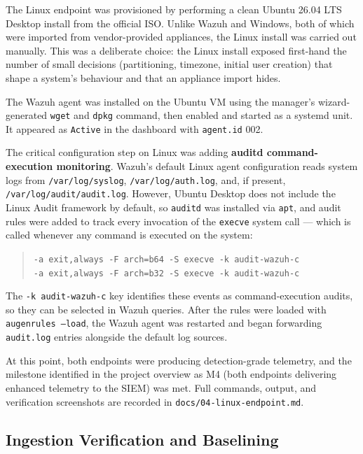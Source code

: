 The Linux endpoint was provisioned by performing a clean Ubuntu 26.04 LTS
Desktop install from the official ISO. Unlike Wazuh and Windows, both of which
were imported from vendor-provided appliances, the Linux install was carried
out manually. This was a deliberate choice: the Linux install exposed
first-hand the number of small decisions (partitioning, timezone, initial
user creation) that shape a system's behaviour and that an appliance import
hides.

The Wazuh agent was installed on the Ubuntu VM using the manager's
wizard-generated \texttt{wget} and \texttt{dpkg} command, then enabled and
started as a systemd unit. It appeared as \texttt{Active} in the dashboard
with \texttt{agent.id} 002.

The critical configuration step on Linux was adding \textbf{auditd
command-execution monitoring}. Wazuh's default Linux agent configuration
reads system logs from \texttt{/var/log/syslog}, \texttt{/var/log/auth.log},
and, if present, \texttt{/var/log/audit/audit.log}. However, Ubuntu Desktop
does not include the Linux Audit framework by default, so \texttt{auditd} was
installed via \texttt{apt}, and audit rules were added to track every
invocation of the \texttt{execve} system call --- which is called whenever
any command is executed on the system:

\begin{quote}\small
\texttt{-a exit,always -F arch=b64 -S execve -k audit-wazuh-c}\\
\texttt{-a exit,always -F arch=b32 -S execve -k audit-wazuh-c}
\end{quote}

The \texttt{-k audit-wazuh-c} key identifies these events as
command-execution audits, so they can be selected in Wazuh queries. After
the rules were loaded with \texttt{augenrules --load}, the Wazuh agent was
restarted and began forwarding \texttt{audit.log} entries alongside the
default log sources.

At this point, both endpoints were producing detection-grade telemetry, and
the milestone identified in the project overview as M4 (both endpoints
delivering enhanced telemetry to the SIEM) was met. Full commands, output,
and verification screenshots are recorded in
\texttt{docs/04-linux-endpoint.md}.

\subsection{Ingestion Verification and Baselining}
\label{sec:impl-verify}

